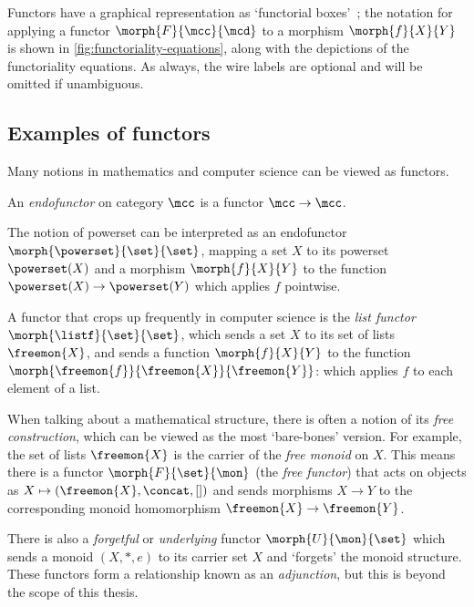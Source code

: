 Functors have a graphical representation as `functorial
boxes'~\cite{mellies2006functorial}; the notation for applying a functor
\(\morph{F}{\mcc}{\mcd}\) to a morphism \(\morph{f}{X}{Y}\) is shown in
\cref{fig:functoriality-equations}, along with the depictions of the
functoriality equations.
As always, the wire labels are optional and will be omitted if unambiguous.



\subsection{Examples of functors}

Many notions in mathematics and computer science can be viewed as functors.

\begin{definition}[Endofunctor]
    An \emph{endofunctor} on category \(\mcc\) is a functor \(\mcc \to \mcc\).
\end{definition}

\begin{example}
    The notion of powerset can be interpreted as an endofunctor \(
    \morph{\powerset}{\set}{\set}
    \), mapping a set \(X\) to its powerset \(\powerset(X)\) and a morphism
    \(\morph{f}{X}{Y}\) to the function \(\powerset(X) \to \powerset(Y)\) which
    applies \(f\) pointwise.
\end{example}

\begin{example}\label{ex:list-functor}
    A functor that crops up frequently in computer science is the
    \emph{list functor} \(\morph{\listf}{\set}{\set}\), which sends a set
    \(X\) to its set of lists \(\freemon{X}\), and sends a function
    \(\morph{f}{X}{Y}\) to the function
    \(\morph{\freemon{f}}{\freemon{X}}{\freemon{Y}}\): which applies \(f\)
    to each element of a list.
\end{example}

\begin{example}\label{ex:free-monoid}
    When talking about a mathematical structure, there is often a notion
    of its \emph{free construction}, which can be viewed as the most
    `bare-bones' version.
    For example, the set of lists \(\freemon{X}\) is the carrier of the
    \emph{free monoid} on \(X\).
    This means there is a functor \(\morph{F}{\set}{\mon}\) (the
    \emph{free functor}) that acts on objects as \(
    X \mapsto (\freemon{X}, \concat, [])
    \) and sends morphisms \(X \to Y\) to the corresponding monoid homomorphism
    \(\freemon{X} \to \freemon{Y}\).

    There is also a \emph{forgetful} or \emph{underlying} functor
    \(\morph{U}{\mon}{\set}\) which sends a monoid \((X, *, e)\) to its carrier
    set \(X\) and `forgets' the monoid structure.
    These functors form a relationship known as an \emph{adjunction}, but this
    is beyond the scope of this thesis.
\end{example}

